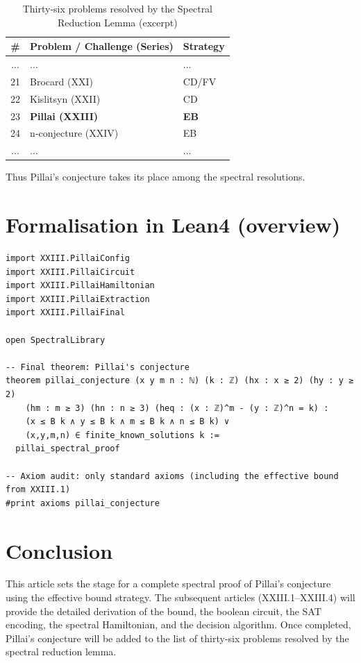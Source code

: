 \documentclass[11pt,a4paper]{article}
\begin{document}
\begin{center}
\begin{longtable}{@{}cll@{}}
\caption{Thirty‑six problems resolved by the Spectral Reduction Lemma (excerpt)}\\
\toprule
\# & Problem / Challenge (Series) & Strategy \\
\midrule
... & ... & ... \\
21 & Brocard (XXI) & CD/FV \\
22 & Kislitsyn (XXII) & CD \\
23 & \textbf{Pillai (XXIII)} & \textbf{EB} \\
24 & n‑conjecture (XXIV) & EB \\
... & ... & ... \\
\bottomrule
\end{longtable}
\end{center}

Thus Pillai's conjecture takes its place among the spectral resolutions.

\section{Formalisation in Lean4 (overview)}

\begin{lstlisting}[style=lean, caption={XXIII_MainPillai.lean (sketch)}]
import XXIII.PillaiConfig
import XXIII.PillaiCircuit
import XXIII.PillaiHamiltonian
import XXIII.PillaiExtraction
import XXIII.PillaiFinal

open SpectralLibrary

-- Final theorem: Pillai's conjecture
theorem pillai_conjecture (x y m n : ℕ) (k : ℤ) (hx : x ≥ 2) (hy : y ≥ 2)
    (hm : m ≥ 3) (hn : n ≥ 3) (heq : (x : ℤ)^m - (y : ℤ)^n = k) :
    (x ≤ B k ∧ y ≤ B k ∧ m ≤ B k ∧ n ≤ B k) ∨
    (x,y,m,n) ∈ finite_known_solutions k :=
  pillai_spectral_proof

-- Axiom audit: only standard axioms (including the effective bound from XXIII.1)
#print axioms pillai_conjecture
\end{lstlisting}

\section{Conclusion}

This article sets the stage for a complete spectral proof of Pillai's conjecture using the effective bound strategy. The subsequent articles (XXIII.1–XXIII.4) will provide the detailed derivation of the bound, the boolean circuit, the SAT encoding, the spectral Hamiltonian, and the decision algorithm. Once completed, Pillai's conjecture will be added to the list of thirty‑six problems resolved by the spectral reduction lemma.
\end{document}
